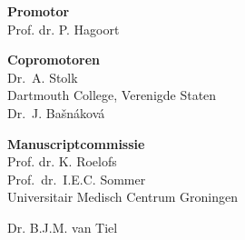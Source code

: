 \newpage
\thispagestyle{empty}

{\setlength{\parindent}{0cm}\raggedright

\newpage

\hspace{-12pt}\textbf{Promotor}\\
Prof. dr. P. Hagoort
\vspace{12pt}

\hspace{-12pt}\textbf{Copromotoren}\\
Dr.~A. Stolk \\ 
\vspace{-.1cm}
{\footnotesize Dartmouth College, Verenigde Staten}\\
\vspace{4pt}
Dr.~J. Ba\v{s}n\'{a}kov\'{a} \\
\vspace{20pt}

\hspace{-12pt}\textbf{Manuscriptcommissie}\\
Prof. dr. K. Roelofs\\

\vspace{6pt}
Prof.~dr.~I.E.C. Sommer\\
\vspace{-.1cm}
{\footnotesize Universitair Medisch Centrum Groningen}

\vspace{-6pt}
Dr. B.J.M. van Tiel\\


\vfill
}
